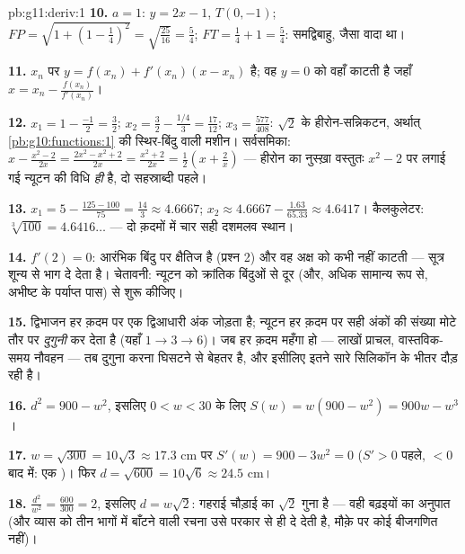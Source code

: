 \begin{solution}{pb:g11:deriv:1}
\textbf{10.} $a = 1$:  $y = 2x - 1$, $T(0, -1)$; $FP = \sqrt{1 + \left(1 - \frac14\right)^2} =
\sqrt{\frac{25}{16}} = \frac54$; $FT = \frac14 + 1 = \frac54$: समद्विबाहु,
जैसा वादा था।

\textbf{11.} $x_n$ पर  $y = f(x_n) + f'(x_n)(x - x_n)$ है; वह $y = 0$ को वहाँ काटती है जहाँ
$x = x_n - \frac{f(x_n)}{f'(x_n)}$।

\textbf{12.} $x_1 = 1 - \frac{-1}{2} = \frac32$; $x_2 = \frac32 - \frac{1/4}{3} = \frac{17}{12}$; $x_3 = \frac{577}{408}$: $\sqrt2$ के हीरोन-सन्निकटन, अर्थात् \cref{pb:g10:functions:1} की
स्थिर-बिंदु वाली मशीन। सर्वसमिका: $x - \frac{x^2 - 2}{2x} = \frac{2x^2 - x^2 + 2}{2x}
= \frac{x^2 + 2}{2x} = \frac12\left(x + \frac2x\right)$ --- हीरोन का नुस्ख़ा वस्तुतः $x^2 - 2$
पर लगाई गई न्यूटन की विधि \emph{ही} है, दो सहस्राब्दी पहले।

\textbf{13.} $x_1 = 5 - \frac{125 - 100}{75} = \frac{14}{3}
\approx 4.6667$; $x_2 \approx 4.6667 - \frac{1.63}{65.33}
\approx 4.6417$। कैलकुलेटर: $\sqrt[3]{100} = 4.6416\ldots$ --- दो क़दमों में चार सही दशमलव
स्थान।

\textbf{14.} $f'(2) = 0$: आरंभिक बिंदु पर  क्षैतिज है (प्रश्न 2) और वह
अक्ष को कभी नहीं काटती --- सूत्र शून्य से भाग दे देता है। चेतावनी: न्यूटन को
क्रांतिक बिंदुओं से दूर (और, अधिक सामान्य रूप से, अभीष्ट  के पर्याप्त
पास) से शुरू कीजिए।

\textbf{15.} द्विभाजन हर क़दम पर एक द्विआधारी अंक जोड़ता है; न्यूटन हर क़दम
पर सही अंकों की संख्या मोटे तौर पर \emph{दुगुनी} कर देता है (यहाँ $1 \to 3 \to 6$)।
जब हर क़दम महँगा हो --- लाखों प्राचल, वास्तविक-समय नौवहन --- तब दुगुना करना
घिसटने से बेहतर है, और इसीलिए इतने सारे सिलिकॉन के भीतर  दौड़
रही है।

\textbf{16.} $d^2 = 900 - w^2$, इसलिए $0 < w < 30$ के लिए $S(w) = w(900 - w^2) = 900w - w^3$।

\textbf{17.} $w = \sqrt{300} = 10\sqrt3 \approx 17.3$ cm पर $S'(w) = 900 - 3w^2 = 0$ ($S' > 0$ पहले, $< 0$ बाद में: एक )। फिर
$d = \sqrt{600} = 10\sqrt6 \approx 24.5$ cm।

\textbf{18.} $\frac{d^2}{w^2} = \frac{600}{300} = 2$, इसलिए $d = w\sqrt2$: गहराई चौड़ाई का $\sqrt2$ गुना है --- वही
बढ़इयों का अनुपात (और व्यास को तीन भागों में बाँटने वाली रचना उसे परकार से
ही दे देती है, मौक़े पर कोई बीजगणित नहीं)।


\end{solution}
